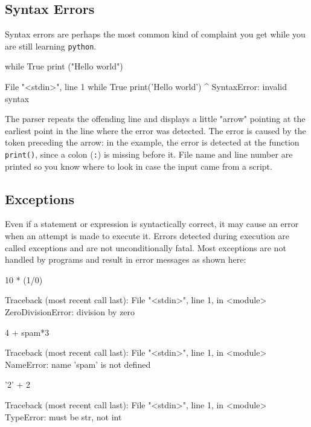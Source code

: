 \subsection{Syntax Errors}
Syntax errors are perhaps the most common kind of complaint you get while you are still learning \texttt{python}.

\begin{ipythonnon}
while True
    print ("Hello world")
\end{ipythonnon}
\begin{ioutput}
  File "<stdin>", line 1
    while True print('Hello world')
               ^
SyntaxError: invalid syntax
\end{ioutput}

The parser repeats the offending line and displays a little "arrow" pointing at the earliest point in the line where the error was detected. The error is caused by the token preceding the arrow: in the example, the error is detected at the function \texttt{print()}, since a colon (\texttt{:}) is missing before it. File name and line number are printed so you know where to look in case the input came from a script.

\subsection{Exceptions}
Even if a statement or expression is syntactically correct, it may cause an error when an attempt is made to execute it. Errors detected during execution are called exceptions and are not unconditionally fatal. Most exceptions are not handled by programs and result in error messages as shown here:

\begin{ipythonnon}
10 * (1/0)
\end{ipythonnon}
\begin{ioutput}
Traceback (most recent call last):
  File "<stdin>", line 1, in <module>
ZeroDivisionError: division by zero
\end{ioutput}

\begin{ipythonnon}
4 + spam*3
\end{ipythonnon}
\begin{ioutput}
Traceback (most recent call last):
  File "<stdin>", line 1, in <module>
NameError: name 'spam' is not defined
\end{ioutput}

\begin{ipythonnon}
'2' + 2
\end{ipythonnon}
\begin{ioutput}
Traceback (most recent call last):
  File "<stdin>", line 1, in <module>
TypeError: must be str, not int
\end{ioutput}

